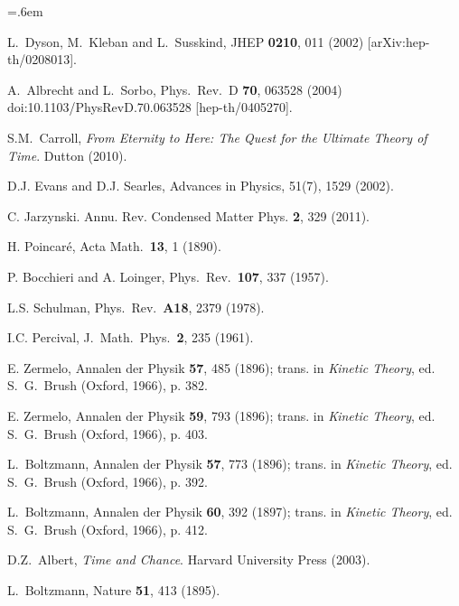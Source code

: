 \documentclass[12pt,letterpaper]{article}
\begin{document}
\begin{thebibliography}{999}
\parindent=.6em
\raggedright

  L.~Dyson, M.~Kleban and L.~Susskind,
  JHEP {\bf 0210}, 011 (2002)
  [arXiv:hep-th/0208013].

  A.~Albrecht and L.~Sorbo,
  Phys.\ Rev.\ D {\bf 70}, 063528 (2004)
  doi:10.1103/PhysRevD.70.063528
  [hep-th/0405270].

  S.M.~Carroll,
  \emph{From Eternity to Here: The Quest for the Ultimate Theory of Time}. Dutton (2010).
  
D.J. Evans and D.J. Searles, Advances in Physics, 51(7), 1529 (2002).

C. Jarzynski. Annu. Rev. Condensed Matter Phys. {\bf 2}, 329 (2011).

H. Poincar\'e, Acta Math.\ {\bf 13}, 1 (1890).

 P. Bocchieri and A. Loinger,
Phys.\ Rev.\  {\bf 107}, 337 (1957).

L.S. Schulman,
 Phys.\ Rev.\  {\bf A18}, 2379 (1978).

I.C. Percival,
 J.\ Math.\ Phys.\  {\bf 2}, 235 (1961).
 
E. Zermelo, Annalen der Physik {\bf 57}, 485 (1896);
trans. in {\it Kinetic Theory}, ed. S.~G.~Brush
(Oxford, 1966), p. 382.
  
E. Zermelo, Annalen der Physik {\bf 59}, 793 (1896);
trans. in {\it Kinetic Theory}, ed. S.~G.~Brush
(Oxford, 1966), p. 403.
  
L.\ Boltzmann, Annalen der Physik {\bf 57}, 773 (1896);  
trans. in {\it Kinetic Theory}, ed. S.~G.~Brush
(Oxford, 1966), p. 392.

L.\ Boltzmann, Annalen der Physik {\bf 60}, 392 (1897);  
trans. in {\it Kinetic Theory}, ed. S.~G.~Brush
(Oxford, 1966), p. 412.

 D.Z.\ Albert, \emph{Time and Chance}. Harvard University Press (2003).

 L.~Boltzmann, Nature {\bf 51}, 413 (1895).
  

\end{thebibliography}
\end{document}
